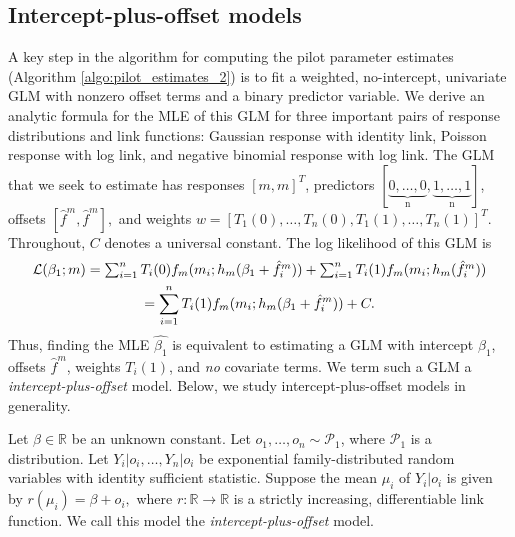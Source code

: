 \documentclass[12pt]{article}
\begin{document}
\begin{appendices}
\begin{refsection}
		\subsection*{Intercept-plus-offset models}
		
		A key step in the algorithm for computing the pilot parameter estimates (Algorithm \ref{algo:pilot_estimates_2}) is to fit a weighted, no-intercept, univariate GLM with nonzero offset terms and a binary predictor variable. We derive an analytic formula for the MLE of this GLM for three important pairs of response distributions and link functions: Gaussian response with identity link, Poisson response with log link, and negative binomial response with log link. The GLM that we seek to estimate has responses $[m,m]^T$, predictors $[\underbrace{0, \dots, 0}_\textrm{n}, \underbrace{1, \dots, 1}_\textrm{n}]$, offsets $[\hat{f}^m, \hat{f}^m],$ and weights $w = [T_1(0), \dots, T_n(0), T_1(1), \dots, T_n(1)]^T.$ Throughout, $C$ denotes a universal constant. The log likelihood of this GLM is
		\begin{multline}\label{stat_acc_1}
		$$\mathcal{L}(\beta_1; m) = \sum_{i=1}^n T_i(0) f_m(m_i; h_m(\beta_1 + \hat{f}^m_i )) + \sum_{i=1}^n T_i(1) f_m(m_i; h_m(\hat{f}^m_i)) \\ = \sum_{i=1}^n T_i(1) f_m(m_i; h_m(\beta_1 + \hat{f}^m_i )) + C.$$
		\end{multline}
		Thus, finding the MLE $\hat{\beta_1}$ is equivalent to estimating a GLM with intercept $\beta_1$, offsets $\hat{f}^m$, weights $T_i(1)$, and \textit{no} covariate terms. We term such a GLM a \textit{intercept-plus-offset} model. Below, we study intercept-plus-offset models in generality.
		
		Let $\beta \in \mathbb{R}$ be an unknown constant. Let $o_1, \dots, o_n \sim \mathcal{P}_1$, where $\mathcal{P}_1$ is a distribution. Let $Y_i|o_i, \dots, Y_n|o_i$ be exponential family-distributed random variables with identity sufficient statistic. Suppose the mean $\mu_i$ of $Y_i|o_i$ is given by $r(\mu_i) = \beta + o_i,$ where $r: \mathbb{R} \to \mathbb{R}$ is a strictly increasing, differentiable link function. We call this model the \textit{intercept-plus-offset} model.
		

\end{refsection}
\end{appendices}
\end{document}

